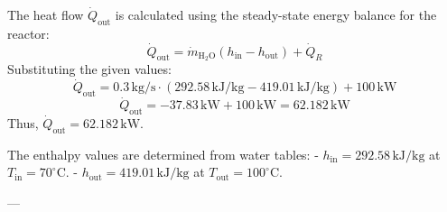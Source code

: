 The heat flow \( \dot{Q}_{\text{out}} \) is calculated using the steady-state energy balance for the reactor:  
\[
\dot{Q}_{\text{out}} = \dot{m}_{\text{H}_2\text{O}} (h_{\text{in}} - h_{\text{out}}) + \dot{Q}_R
\]  
Substituting the given values:  
\[
\dot{Q}_{\text{out}} = 0.3 \, \text{kg/s} \cdot (292.58 \, \text{kJ/kg} - 419.01 \, \text{kJ/kg}) + 100 \, \text{kW}
\]  
\[
\dot{Q}_{\text{out}} = -37.83 \, \text{kW} + 100 \, \text{kW} = 62.182 \, \text{kW}
\]  
Thus, \( \dot{Q}_{\text{out}} = 62.182 \, \text{kW} \).  

The enthalpy values are determined from water tables:  
- \( h_{\text{in}} = 292.58 \, \text{kJ/kg} \) at \( T_{\text{in}} = 70^\circ\text{C} \).  
- \( h_{\text{out}} = 419.01 \, \text{kJ/kg} \) at \( T_{\text{out}} = 100^\circ\text{C} \).  

---